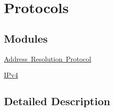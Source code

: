 \hypertarget{group__protocols}{}\section{Protocols}
\label{group__protocols}
\subsection*{Modules}
\begin{DoxyCompactItemize}
\item 
\mbox{\hyperlink{group__arp}{Address Resolution Protocol}}
\item 
\mbox{\hyperlink{group__ipv4}{I\+Pv4}}
\end{DoxyCompactItemize}


\subsection{Detailed Description}
